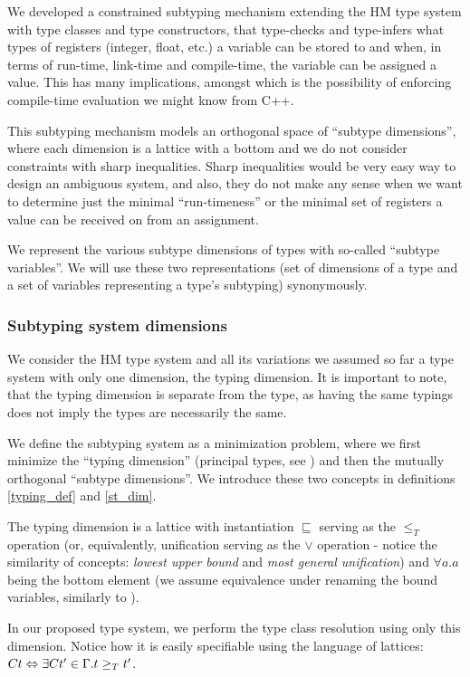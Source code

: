 We developed a constrained subtyping mechanism extending the HM type system with type classes and type constructors, that type-checks and type-infers what types of registers (integer, float, etc.) a variable can be stored to and when, in terms of run-time, link-time and compile-time, the variable can be assigned a value. This has many implications, amongst which is the possibility of enforcing compile-time evaluation we might know from C++.

This subtyping mechanism models an orthogonal space of ``subtype dimensions'', where each dimension is a lattice with a bottom and we do not consider constraints with sharp inequalities. Sharp inequalities would be very easy way to design an ambiguous system, and also, they do not make any sense when we want to determine just the minimal ``run-timeness'' or the minimal set of registers a value can be received on from an assignment.

We represent the various subtype dimensions of types with so-called ``subtype variables''. We will use these two representations (set of dimensions of a type and a set of variables representing a type's subtyping) synonymously.

\subsubsection{Subtyping system dimensions}

\begin{remark}
    We consider the HM type system and all its variations we assumed so far a type system with only one dimension, the typing dimension. It is important to note, that the typing dimension is separate from the type, as having the same typings does not imply the types are necessarily the same.
\end{remark}

\begin{defn}
    We define the subtyping system as a minimization problem, where we first minimize the ``typing dimension'' (principal types, see \cite{damas1982principal}) and then the mutually orthogonal ``subtype dimensions''. We introduce these two concepts in definitions \ref{typing_def} and \ref{st_dim}.
\end{defn}

\begin{defn}
    \label{typing_def}
    The typing dimension is a lattice with instantiation $\sqsubseteq$ serving as the $\leq_T$ operation (or, equivalently, unification serving as the $\lor$ operation - notice the similarity of concepts: \emph{lowest upper bound} and \emph{most general unification}) and $\forall a . a$ being the bottom element (we assume equivalence under renaming the bound variables, similarly to \cite{barendregt1992lambda}).

    In our proposed type system, we perform the type class resolution using only this dimension. Notice how it is easily specifiable using the language of lattices: $C t \Leftrightarrow \exists C t' \in \Gamma . t \geq_T t'$.
\end{defn}

